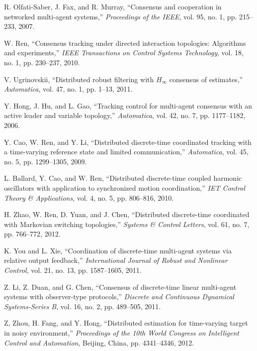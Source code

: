 \documentclass[a4paper,10pt,onecolumn]{article}
\begin{document}
\begin{thebibliography}{99}

 R. Olfati-Saber, J. Fax, and R. Murray, ``Consensus and cooperation in
networked multi-agent systems,'' \emph{Proceedings of the IEEE}, vol. 95, no. 1, pp. 215--233, 2007.

W. Ren, ``Consensus tracking under directed interaction topologies: Algorithms and experiments,''
\emph{IEEE Transactions on Control Systems Technology}, vol. 18, no. 1, pp. 230--237, 2010.

V. Ugrinovskii, ``Distributed robust filtering with $H_{\infty}$ consensus of estimates,''  \emph{Automatica}, vol. 47, no. 1, pp. 1--13, 2011.

Y. Hong, J. Hu, and L. Gao,  ``Tracking control for multi-agent consensus with an active leader and variable topology,''
 \emph{Automatica}, vol. 42, no. 7, pp. 1177--1182, 2006.


Y. Cao, W. Ren, and Y. Li, ``Distributed discrete-time coordinated tracking with a time-varying reference state and limited communication,''
\emph{Automatica}, vol. 45, no. 5, pp. 1299--1305, 2009.

L. Ballard, Y. Cao, and W. Ren, ``Distributed discrete-time coupled harmonic oscillators with application to synchronized motion coordination,''
\emph{IET Control Theory \& Applications}, vol. 4, no. 5, pp. 806--816, 2010.

H. Zhao, W. Ren, D. Yuan, and J. Chen, ``Distributed discrete-time coordinated with Markovian switching topologies,''
\emph{Systems \& Control Letters}, vol. 61, no. 7, pp. 766--772, 2012.

K. You and L. Xie, ``Coordination of discrete-time multi-agent systems via relative output feedback,''
\emph{International Journal of Robust and Nonlinear Control}, vol. 21, no. 13, pp. 1587--1605, 2011.

Z. Li, Z. Duan, and G. Chen, ``Consensus of discrete-time linear multi-agent systems with observer-type protocols,''
 \emph{Discrete and Continuous Dynamical Systems-Series B}, vol. 16, no. 2, pp. 489--505, 2011.


Z, Zhou, H. Fang, and Y. Hong, ``Distributed estimation for time-varying target in noisy environment,''
\emph{Proceedings of the 10th World Congress on Intelligent Control and Automation}, Beijing, China, pp. 4341--4346, 2012.


\end{thebibliography}
\end{document}
